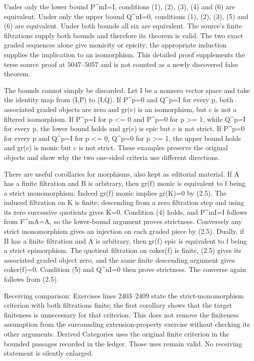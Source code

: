 Under only the lower bound P\^{}mI=I, conditions (1), (2), (3), (4) and (6) are equivalent. Under only the upper bound Q\^{}nI=0, conditions (1), (2), (3), (5) and (6) are equivalent. Under both bounds all six are equivalent. The source's finite filtrations supply both bounds and therefore its theorem is valid. The two exact graded sequences alone give monicity or epicity; the appropriate induction supplies the implication to an isomorphism. This detailed proof supplements the terse source proof at 5047--5057 and is not counted as a newly discovered false theorem.

The bounds cannot simply be discarded. Let I be a nonzero vector space and take the identity map from (I,P) to (I,Q). If P\^{}p=0 and Q\^{}p=I for every p, both associated graded objects are zero and gr(c) is an isomorphism, but c is not a filtered isomorphism. If P\^{}p=I for p \textless= 0 and P\^{}p=0 for p \textgreater= 1, while Q\^{}p=I for every p, the lower bound holds and gr(c) is epic but c is not strict. If P\^{}p=0 for every p and Q\^{}p=I for p \textless= 0, Q\^{}p=0 for p \textgreater= 1, the upper bound holds and gr(c) is monic but c is not strict. These examples preserve the original objects and show why the two one-sided criteria use different directions.

There are useful corollaries for morphisms, also kept as editorial material. If A has a finite filtration and B is arbitrary, then gr(f) monic is equivalent to f being a strict monomorphism. Indeed gr(f) monic implies gr(K)=0 by (2.5). The induced filtration on K is finite; descending from a zero filtration step and using its zero successive quotients gives K=0. Condition (4) holds, and P\^{}mI=I follows from F\^{}mA=A, so the lower-bound argument proves strictness. Conversely any strict monomorphism gives an injection on each graded piece by (2.5). Dually, if B has a finite filtration and A is arbitrary, then gr(f) epic is equivalent to f being a strict epimorphism. The quotient filtration on coker(f) is finite, (2.5) gives its associated graded object zero, and the same finite descending argument gives coker(f)=0. Condition (5) and Q\^{}nI=0 then prove strictness. The converse again follows from (2.5).

Receiving comparison: Exercises lines 2403--2409 state the strict-monomorphism criterion with both filtrations finite; the first corollary shows that the target finiteness is unnecessary for that criterion. This does not remove the finiteness assumption from the surrounding extension-property exercise without checking its other arguments. Derived Categories uses the original finite criterion in the bounded passages recorded in the ledger. Those uses remain valid. No receiving statement is silently enlarged.

